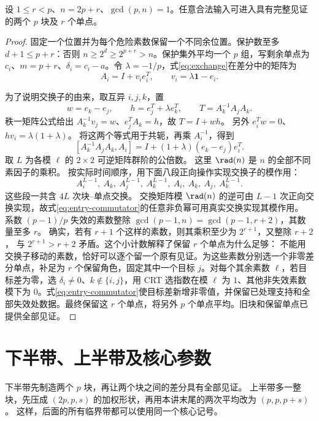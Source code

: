 \begin{lemma}[保留见证的双块入口]\label{lem:two-block-entry}
设 $1\le r<p$、$n=2p+r$、$\gcd(p,n)=1$。任意合法输入可进入具有完整见证的两个 $p$ 块及 $r$ 个单点。
\end{lemma}
\begin{proof}
固定一个位置并为每个危险素数保留一个不同余位置。保护数至多 $d+1\le p+r$：否则 $n\ge2^d\ge2^{p+r}>n$。保护集外平均一个 $p$ 组，写剩余单点为 $c_i$、$m=p+r$、$\delta_i=c_i-a$。令 $\lambda=-1/p$，式\eqref{eq:exchange}在差分中的矩阵为
\[
A_i=I+v_i e_i^T,\qquad v_i=\lambda\mathbf1-e_i.
\]

为了说明交换子的由来，取互异 $i,j,k$，置
\[
w=e_k-e_j,\qquad h=e_j^T+\lambda e_k^T,
\qquad T=A_k^{-1}A_jA_k.
\]
秩一矩阵公式给出 $A_k^{-1}v_j=w$、$e_j^TA_k=h$，故 $T=I+wh$。
另外 $e_i^Tw=0$、$hv_i=\lambda(1+\lambda)$。
将这两个等式用于共轭，再乘 $A_i^{-1}$，得到
\begin{equation}\label{eq:entry-commutator}
[A_k^{-1}A_jA_k,A_i]
=I+(1+\lambda)(e_k-e_j)e_i^T.
\end{equation}
取 $L$ 为各模 $\ell$ 的 $2\times2$ 可逆矩阵群阶的公倍数。
这里 $\rad(n)$ 是 $n$ 的全部不同素因子的乘积。
按实际时间顺序，用下面八段正向操作实现交换子的模作用：
\[
 A_i^{L-1},\ A_k,\ A_j^{L-1},\ A_k^{L-1},\
 A_i,\ A_k,\ A_j,\ A_k^{L-1}.
\]
这些段一共含 $4L$ 次块--单点交换。
交換矩阵模 $\rad(n)$ 的逆可由 $L-1$ 次正向交换实现，故式\eqref{eq:entry-commutator}的任意非负幂可用真实交换实现其模作用。
系数 $(p-1)/p$ 失效的素数整除 $\gcd(p-1,n)=\gcd(p-1,r+2)$，其数量至多 $r$。
确实，若有 $r+1$ 个这样的素数，则其乘积至少为 $2^{r+1}$，又整除 $r+2$，
与 $2^{r+1}>r+2$ 矛盾。这个小计数解释了保留 $r$ 个单点为什么足够：
不能用交换子移动的素数，恰好可以逐个留一个原有见证。为这些素数分别选一个非零差分单点，补足为 $r$ 个保留角色，固定其中一个目标 $j$。对每个其余素数 $\ell$，若目标差为零，选 $\delta_i\ne0$、$k\notin\{i,j\}$，用 CRT 选指数在模 $\ell$ 为 $1$、其他非失效素数模下为 $0$。式\eqref{eq:entry-commutator}使目标差新增非零值，并保留已处理支持和全部失效处数据。最终保留这 $r$ 个单点，将另外 $p$ 个单点平均。旧块和保留单点已提供全部见证。
\end{proof}


\section{下半带、上半带及核心参数}
下半带先制造两个 $p$ 块，再让两个块之间的差分具有全部见证。
上半带多一整块，先压成 $(2p,p,s)$ 的加权形状，再用本讲末尾的两次平均改为 $(p,p,p+s)$。
这样，后面的所有临界带都可以使用同一个核心记号。

